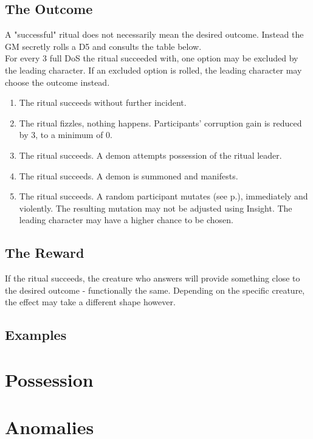 \documentclass[12pt,a4paper,openany]{book}
\begin{document}
	\section{The Outcome}
	A "successful" ritual does not necessarily mean the desired outcome. Instead the GM secretly rolls a D5 and consults the table below.\\
	For every 3 full DoS the ritual succeeded with, one option may be excluded by the leading character. If an excluded option is rolled, the leading character may choose the outcome instead.
	\par
	\vspace{-5mm}
	\begin{enumerate}
		\raggedright
		\setlength\itemsep{-8mm}
		\item The ritual succeeds without further incident.
		\item The ritual fizzles, nothing happens. Participants' corruption gain is reduced by 3, to a minimum of 0.
		\item The ritual succeeds. A demon attempts possession of the ritual leader.
		\item The ritual succeeds. A demon is summoned and manifests.
		\item The ritual succeeds. A random participant mutates (see p.\pageref{ch:mutation}), immediately and violently.
		The resulting mutation may not be adjusted using Insight.
		The leading character may have a higher chance to be chosen.
	\end{enumerate}
	\section{The Reward}
	If the ritual succeeds, the creature who answers will provide something close to the desired outcome - functionally the same.
	Depending on the specific creature, the effect may take a different shape however.
	\section{Examples}
	
	
	\chapter{Possession}
	
	
	
	\chapter{Anomalies}
	
	
\end{document}
